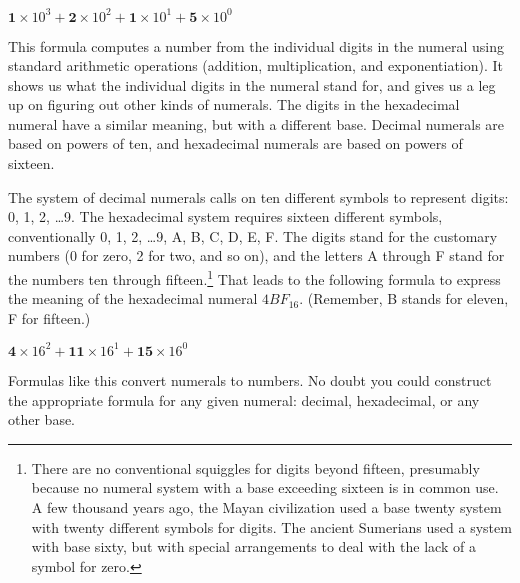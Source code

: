 \begin{center}
$\textbf{1} \times 10^3 + \textbf{2} \times 10^2 + \textbf{1} \times 10^1 + \textbf{5} \times 10^0$
\end{center}

This formula computes a number from the individual digits
in the numeral using standard arithmetic operations
(addition, multiplication, and exponentiation).
It shows us what the individual digits in the numeral stand for,
and gives us a leg up on figuring out other kinds of numerals.
The digits in the hexadecimal numeral have a similar meaning,
but with a different base. Decimal numerals are based on
powers of ten, and hexadecimal numerals are based on powers of sixteen.

The system of decimal numerals calls on ten different symbols to represent digits:
0, 1, 2, \dots 9.
The hexadecimal system requires sixteen different symbols, conventionally
0, 1, 2, \dots 9, A, B, C, D, E, F.
The digits stand for the customary numbers
(0 for zero, 2 for two, and so on),
and the letters A through F
stand for the numbers ten through fifteen.\footnote{There
are no conventional squiggles for digits beyond fifteen,
presumably because no numeral system
with a base exceeding sixteen is in common use.
A few thousand years ago, the Mayan civilization used a base twenty system
with twenty different symbols for digits.
The ancient Sumerians used a system with base sixty,
but with special arrangements to deal with the lack of a symbol for zero.}
That leads to the following
formula to express the meaning of the hexadecimal numeral $4BF_{16}$.
(Remember, B stands for eleven, F for fifteen.)
\begin{center}
$\textbf{4} \times 16^2 + \textbf{11} \times 16^1 + \textbf{15} \times 16^0$
\end{center}
Formulas like this
convert numerals to numbers.
No doubt you could construct the appropriate formula
for any given numeral: decimal, hexadecimal, or any other base.


